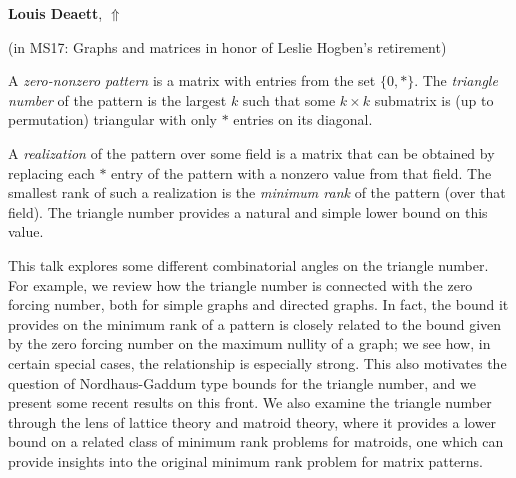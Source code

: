 \documentclass[ILAS2025-program.tex]{subfiles}
\begin{document}
\hypertarget{down0177}{}\begin{ilasabstract}
    
\textbf{Louis Deaett},  \hfill \hyperlink{up0177}{$\Uparrow$}
    
    
(in {\color{mstitle}MS17: Graphs and matrices in honor of Leslie Hogben's retirement})
        
\mtskip
    A \emph{zero-nonzero pattern} is a matrix with entries from the set $\{0,*\}$.  The \emph{triangle number} of the pattern is the largest $k$ such that some $k\times k$ submatrix is (up to permutation) triangular with only $*$ entries on its diagonal.


A \emph{realization} of the pattern over some field is a matrix that can be obtained by replacing each $*$ entry of the pattern with a nonzero value from that field.
The smallest rank of such a realization is the \emph{minimum rank} of the pattern (over that field).  The triangle number provides a natural and simple lower bound on this value.

This talk explores some different combinatorial angles on the triangle number.  For example, we review how the triangle number is connected with the zero forcing number, both for simple graphs and directed graphs.  In fact, the bound it provides on the minimum rank of a pattern is closely related to the bound given by the zero forcing number on the maximum nullity of a graph; we see how, in certain special cases, the relationship is especially strong.  This also motivates the question of Nordhaus-Gaddum type bounds for the triangle number, and we present some recent results on this front.  We also examine the triangle number through the lens of lattice theory and matroid theory, where it provides a lower bound on a related class of minimum rank problems for matroids, one which can provide insights into the original minimum rank problem for matrix patterns.

\end{ilasabstract}
    
\end{document}
